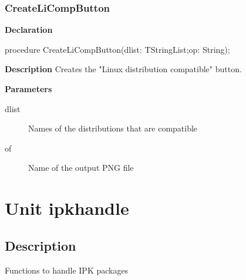 \documentclass{report}
\newif\ifpdf
\begin{document}
\subsection*{CreateLiCompButton}
\fi
\label{ipkbuild-CreateLiCompButton}
\begin{list}{}{
\setlength{\itemindent}{0cm}
\setlength{\listparindent}{0cm}
\setlength{\leftmargin}{\evensidemargin}
\addtolength{\leftmargin}{\tmplength}
\settowidth{\labelsep}{X}
\addtolength{\leftmargin}{\labelsep}
\setlength{\labelwidth}{\tmplength}
}
\item[\textbf{Declaration}\hfill]
\ifpdf
\begin{flushleft}
\fi
\begin{ttfamily}
procedure CreateLiCompButton(dlist: TStringList;op: String);\end{ttfamily}

\ifpdf
\end{flushleft}
\fi

\par
\item[\textbf{Description}]
Creates the "Linux distribution compatible" button.  \par
\item[\textbf{Parameters}]
\begin{description}
\item[dlist] Names of the distributions that are compatible
\item[of] Name of the output PNG file
\end{description}


\end{list}
\chapter{Unit ipkhandle}
\label{ipkhandle}
\section{Description}
Functions to handle IPK packages
\end{document}
